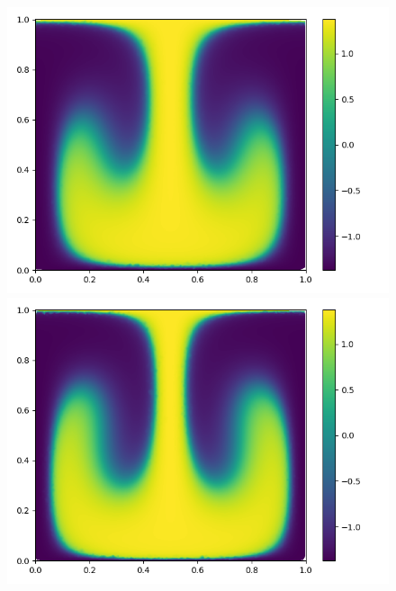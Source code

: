 \documentclass[a4paper, 14pt]{extarticle}
\begin{document}
		\begin{figure}[H]
			\begin{minipage}{0.5\textwidth}
				\centering
				\includegraphics[width = \linewidth]{7.png}
			\end{minipage}\hfill
			\begin{minipage}{0.5\textwidth}
				\centering
				\includegraphics[width = \linewidth]{8.png}
			\end{minipage}\hfill
		\end{figure}
	
\end{document}
